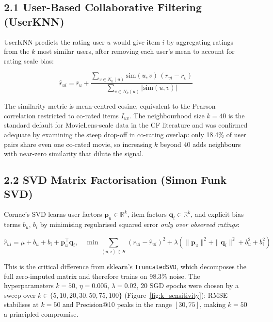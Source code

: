 \documentclass[11pt,a4paper]{article}
\begin{document}
\subsection*{2.1 User-Based Collaborative Filtering (UserKNN)}

UserKNN predicts the rating user $u$ would give item $i$ by aggregating ratings from the $k$ most similar users, after removing each user's mean to account for rating scale bias:

\begin{equation}
\hat{r}_{ui} = \bar{r}_u +
\frac{\displaystyle\sum_{v \in N_k(u)} \mathrm{sim}(u,v)\,(r_{vi}-\bar{r}_v)}
     {\displaystyle\sum_{v \in N_k(u)} |\mathrm{sim}(u,v)|}
\end{equation}

The similarity metric is mean-centred cosine, equivalent to the Pearson correlation restricted to co-rated items $I_{uv}$. The neighbourhood size $k=40$ is the standard default for MovieLens-scale data in the CF literature \cite{herlocker1999algorithmic} and was confirmed adequate by examining the steep drop-off in co-rating overlap: only 18.4\% of user pairs share even one co-rated movie, so increasing $k$ beyond 40 adds neighbours with near-zero similarity that dilute the signal.

\subsection*{2.2 SVD Matrix Factorisation (Simon Funk SVD)}

Cornac's SVD \cite{koren2009matrix} learns user factors $\mathbf{p}_u \in \mathbb{R}^k$, item factors $\mathbf{q}_i \in \mathbb{R}^k$, and explicit bias terms $b_u$, $b_i$ by minimising regularised squared error \emph{only over observed ratings}:

\begin{equation}
\hat{r}_{ui} = \mu + b_u + b_i + \mathbf{p}_u^\top\mathbf{q}_i, \quad
\min \sum_{(u,i)\in K}\!\!\left(r_{ui}-\hat{r}_{ui}\right)^2
+ \lambda\!\left(\|\mathbf{p}_u\|^2+\|\mathbf{q}_i\|^2+b_u^2+b_i^2\right)
\end{equation}

This is the critical difference from sklearn's \texttt{TruncatedSVD}, which decomposes the full zero-imputed matrix and therefore trains on 98.3\% noise. The hyperparameters $k=50$, $\eta=0.005$, $\lambda=0.02$, 20 SGD epochs were chosen by a sweep over $k\in\{5,10,20,30,50,75,100\}$ (Figure~\ref{fig:k_sensitivity}): RMSE stabilises at $k=50$ and Precision@10 peaks in the range $[30,75]$, making $k=50$ a principled compromise.
\end{document}
